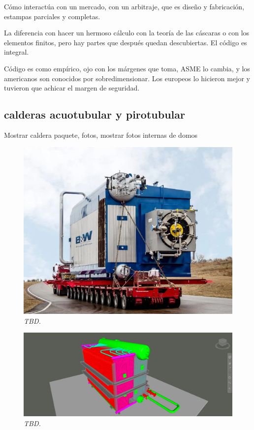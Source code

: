 Cómo interactúa con un mercado, con un arbitraje, que es diseño y fabricación, estampas parciales y completas.

La diferencia con hacer un hermoso cálculo con la teoría de las cáscaras o con los elementos finitos, pero hay partes que después quedan descubiertas. El código es integral.

Código es como empírico, ojo con los márgenes que toma, ASME lo cambia, y los americanos son conocidos por sobredimensionar. Los europeos lo hicieron mejor y tuvieron que achicar el margen de seguridad.

\subsection{calderas acuotubular y pirotubular}
Mostrar caldera paquete, fotos, mostrar fotos internas de domos


\begin{figure}[ht]
    \centerline{\includegraphics[scale=0.6]{b_w_boiler_01.png}}
    \caption{\textit{TBD.}}
    \label{im:b_w_boiler_01}
\end{figure}

\begin{figure}[ht]
    \centerline{\includegraphics[scale=0.2]{b_w_boiler_02.png}}
    \caption{\textit{TBD.}}
    \label{im:b_w_boiler_02}
\end{figure}

